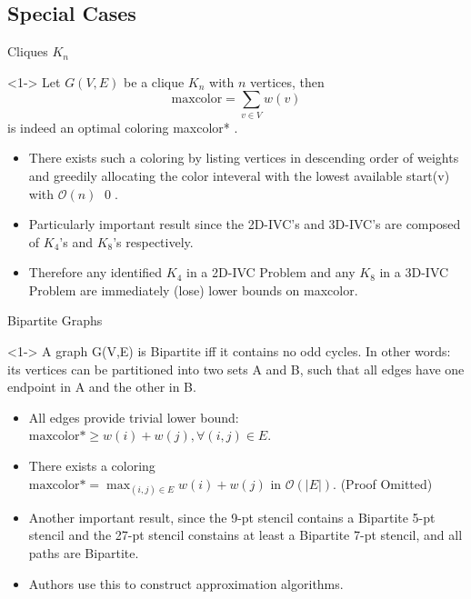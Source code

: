 \subsection{Special Cases}

\begin{frame}{Cliques $K_n$}
  \begin{theorem}<1->
    Let $G(V,E)$ be a clique $K_n$ with $n$ vertices, then  \[ \text{maxcolor}= \sum_{v \in V} w(v) \]
    is indeed an optimal coloring maxcolor* .
  \end{theorem}

  \begin{itemize}
    \item<2-> There exists such a coloring by listing vertices in descending order of weights and
    greedily allocating the color inteveral with the lowest available start(v) with $\mathcal{O}(n)$ \qed .

    \item<3-> Particularly important result since the 2D-IVC's and 3D-IVC's are composed of $K_4$'s and $K_8$'s
    respectively.

    \item<4-> Therefore any identified $K_4$ in a 2D-IVC Problem and any $K_8$ in a 3D-IVC Problem are immediately
    (lose) lower bounds on maxcolor.
  \end{itemize}
\end{frame}

\begin{frame}{Bipartite Graphs}
  \begin{Theorem}<1->
    A graph G(V,E) is Bipartite iff it contains no odd cycles. In other words: its vertices can be partitioned into
    two sets A and B, such that all edges have one endpoint in A and the other in B.
  \end{Theorem}

  \begin{itemize}
    \item<2-> All edges provide trivial lower bound: $ \text{maxcolor*} \ge  w(i) + w(j), \forall (i, j) \in E.$
    \item<3-> There exists a coloring \\ 
    $\text{maxcolor*} = \max_{(i,j) \in E} w(i) + w(j)$ in $\mathcal{O}(|E|)$. (Proof Omitted)
    \item<4-> Another important result, since the 9-pt stencil contains a Bipartite 5-pt stencil and the
    27-pt stencil constains at least a Bipartite 7-pt stencil, and all paths are Bipartite.
    \item<5-> Authors use this to construct approximation algorithms.
  \end{itemize}
\end{frame}

